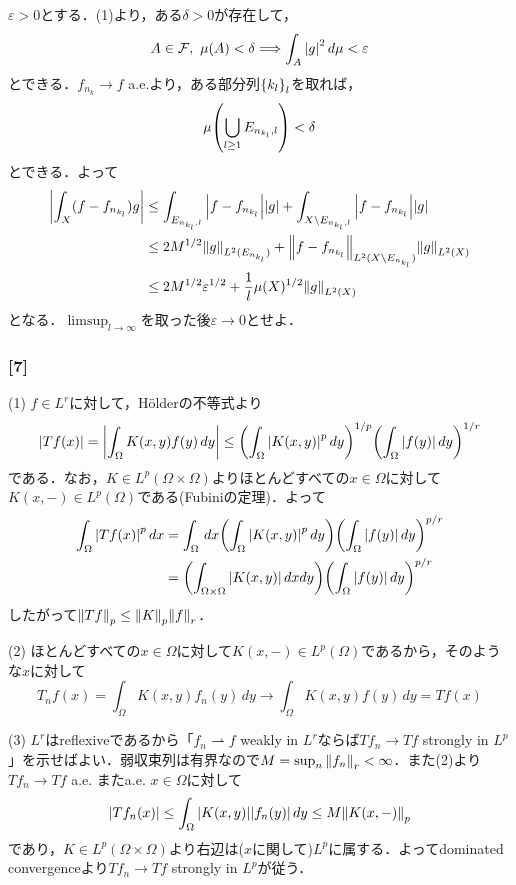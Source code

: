 \documentclass[a4j]{ltjsarticle}
\newcommand{\1}{\mathbbm{1}}
\numberwithin{equation}{section}
\theoremstyle{definition}
\begin{document}
$\varepsilon>0$とする．(1)より，ある$\delta>0$が存在して，
\begin{equation}
    A\in \mathcal{F},\ \mu(A)<\delta\Longrightarrow \int_{A}\abs{g}^2\,d\mu<\varepsilon
\end{equation}
とできる．$f_{n_k}\to f$ a.e.より，ある部分列$\qty{k_l}_l$を取れば，
\begin{equation}
    \mu\qty(\bigcup_{l\geq1}E_{n_{k_l},l})<\delta 
\end{equation}
とできる．よって
\begin{align}
    \abs{\int_{X}(f-f_{n_{k_l}})g}&\leq \int_{E_{n_{k_l},l}}\abs{f-f_{n_{k_l}}}\abs{g}+\int_{X\setminus E_{n_{k_{l}},l}}\abs{f-f_{n_{k_l}}}\abs{g}\\
    &\leq 2M^{1/2}\norm{g}_{L^2(E_{n_{k_l}})}+\norm{f-f_{n_{k_{l}}}}_{L^2(X\setminus E_{n_{k_{l}}})}\norm{g}_{L^2(X)}\\
    &\leq 2M^{1/2}\varepsilon^{1/2}+\frac{1}{l}\mu(X)^{1/2}\norm{g}_{L^2(X)}
\end{align}
となる．$\limsup_{l\to\infty}$を取った後$\varepsilon\to0$とせよ．

\subsubsection*{[7]}
(1) $f\in L^r$に対して，Hölderの不等式より
\begin{equation}
    \abs{Tf(x)}=\abs{\int_{\Omega}K(x,y)f(y)\,dy}\leq \qty(\int_{\Omega}\abs{K(x,y)}^p\,dy)^{1/p}\qty(\int_{\Omega}\abs{f(y)}\,dy)^{1/r}
\end{equation}
である．なお，$K\in L^p(\Omega\times \Omega)$よりほとんどすべての$x\in \Omega$に対して$K(x,-)\in L^p(\Omega)$である(Fubiniの定理)．よって
\begin{align}
    \int_{\Omega}\abs{Tf(x)}^p\,dx&=\int_{\Omega}\,dx \qty(\int_{\Omega}\abs{K(x,y)}^p\,dy)\qty(\int_{\Omega}\abs{f(y)}\,dy)^{p/r}\\
    &=\qty(\int_{\Omega\times \Omega}\abs{K(x,y)}\,dxdy)\qty(\int_{\Omega}\abs{f(y)}\,dy)^{p/r}
\end{align}
したがって$\norm{Tf}_{p}\leq \norm{K}_p\norm{f}_r$．

(2) ほとんどすべての$x\in \Omega$に対して$K(x,-)\in L^p(\Omega)$であるから，そのような$x$に対して
\begin{equation}
    T_nf(x)=\int_{\Omega}K(x,y)f_n(y)\,dy \to \int_{\Omega}K(x,y)f(y)\,dy=Tf(x)
\end{equation}

(3) $L^r$はreflexiveであるから「$f_n\rightharpoonup f$ weakly in $L^r$ならば$Tf_n\to Tf$ strongly in $L^p$」を示せばよい．弱収束列は有界なので$M=\sup_{n}\norm{f_n}_r<\infty$．また(2)より$Tf_n\to Tf$ a.e. またa.e. $x\in \Omega$に対して
\begin{equation}
    \abs{Tf_n(x)}\leq \int_{\Omega}\abs{K(x,y)}\abs{f_n(y)}\,dy\leq M\norm{K(x,-)}_{p}
\end{equation}
であり，$K\in L^p(\Omega\times \Omega)$より右辺は($x$に関して)$L^p$に属する．よってdominated convergenceより$Tf_n\to Tf$ strongly in $L^p$が従う．
\end{document}
